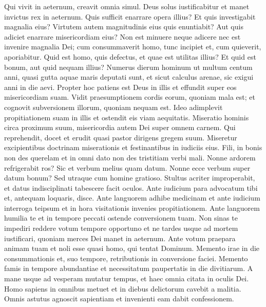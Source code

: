 \begin{biblechapter}
\begin{biblechapter}
\begin{biblechapter}
\begin{biblechapter}
\begin{biblechapter}
\begin{biblechapter}
\begin{biblechapter}
\begin{biblechapter}
\begin{biblechapter}
\begin{biblechapter}
\begin{biblechapter}
\begin{biblechapter}
\begin{biblechapter}
\begin{biblechapter}
\begin{biblechapter}
\begin{biblechapter}
\begin{biblechapter}
\begin{biblechapter}
\verse Qui vivit in aeternum, creavit omnia simul.
 Deus solus iustificabitur et manet invictus rex in aeternum.
 \verse Quis sufficit enarrare opera illius?
 \verse Et quis investigabit magnalia eius?
 \verse Virtutem autem magnitudinis eius quis enuntiabit?
 Aut quis adiciet enarrare misericordiam eius?
 \verse Non est minuere neque adicere
 nec est invenire magnalia Dei;
 \verse cum consummaverit homo, tunc incipiet
 et, cum quieverit, aporiabitur.
 \verse Quid est homo, quis defectus, et quae est utilitas illius?
 Et quid est bonum, aut quid nequam illius?
 \verse Numerus dierum hominum ut multum centum anni,
 quasi gutta aquae maris deputati sunt,
 et sicut calculus arenae, sic exigui anni in die aevi.
 \verse Propter hoc patiens est Deus in illis
 et effundit super eos misericordiam suam.
 \verse Vidit praesumptionem cordis eorum, quoniam mala est;
 et cognovit subversionem illorum, quoniam nequam est.
 \verse Ideo adimplevit propitiationem suam in illis
 et ostendit eis viam aequitatis.
 \verse Miseratio hominis circa proximum suum,
 misericordia autem Dei super omnem carnem.
 \verse Qui reprehendit, docet et erudit
 quasi pastor dirigens gregem suum.
 \verse Miseretur excipientibus doctrinam miserationis
 et festinantibus in iudiciis eius.
 \verse Fili, in bonis non des querelam
 et in omni dato non des tristitiam verbi mali.
 \verse Nonne ardorem refrigerabit ros?
 Sic et verbum melius quam datum.
 \verse Nonne ecce verbum super datum bonum?
 Sed utraque cum homine gratioso.
 \verse Stultus acriter improperabit,
 et datus indisciplinati tabescere facit oculos.
 \verse Ante iudicium para advocatum tibi
 et, antequam loquaris, disce.
 \verse Ante languorem adhibe medicinam
 et ante iudicium interroga teipsum
 et in hora visitationis invenies propitiationem.
 \verse Ante languorem humilia te
 et in tempore peccati ostende conversionem tuam.
 \verse Non sinas te impediri reddere votum tempore opportuno
 et ne tardes usque ad mortem iustificari,
 quoniam merces Dei manet in aeternum.
 \verse Ante votum praepara animam tuam
 et noli esse quasi homo, qui tentat Dominum.
 \verse Memento irae in die consummationis
 et, suo tempore, retributionis in conversione faciei.
 \verse Memento famis in tempore abundantiae
 et necessitatum paupertatis in die divitiarum.
 \verse A mane usque ad vesperam mutatur tempus,
 et haec omnia citata in oculis Dei.
 \verse Homo sapiens in omnibus metuet
 et in diebus delictorum cavebit a malitia.
 \verse Omnis astutus agnoscit sapientiam
 et invenienti eam dabit confessionem.

\end{biblechapter}
\end{biblechapter}
\end{biblechapter}
\end{biblechapter}
\end{biblechapter}
\end{biblechapter}
\end{biblechapter}
\end{biblechapter}
\end{biblechapter}
\end{biblechapter}
\end{biblechapter}
\end{biblechapter}
\end{biblechapter}
\end{biblechapter}
\end{biblechapter}
\end{biblechapter}
\end{biblechapter}
\end{biblechapter}
